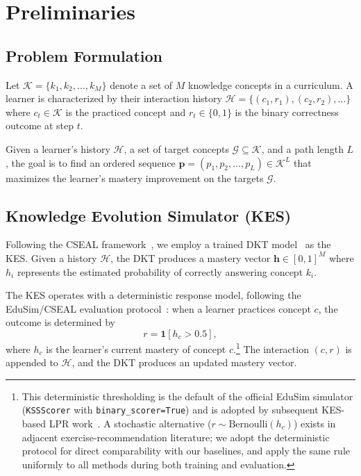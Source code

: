 \documentclass[sigconf,anonymous]{acmart}
\begin{document}
\section{Preliminaries}

\subsection{Problem Formulation}

Let $\mathcal{K} = \{k_1, k_2, \ldots, k_M\}$ denote a set of $M$ knowledge concepts in a curriculum. A learner is characterized by their interaction history $\mathcal{H} = \{(c_1, r_1), (c_2, r_2), \ldots\}$ where $c_t \in \mathcal{K}$ is the practiced concept and $r_t \in \{0, 1\}$ is the binary correctness outcome at step $t$.


\begin{definition}
Given a learner's history $\mathcal{H}$, a set of target concepts $\mathcal{G} \subseteq \mathcal{K}$, and a path length $L$, the goal is to find an ordered sequence $\mathbf{p} = (p_1, p_2, \ldots, p_L) \in \mathcal{K}^L$ that maximizes the learner's mastery improvement on the targets $\mathcal{G}$.
\end{definition}

\subsection{Knowledge Evolution Simulator (KES)}

Following the CSEAL framework~\cite{liu2019cseal}, we employ a trained DKT model~\cite{piech2015dkt} as the KES. Given a history $\mathcal{H}$, the DKT produces a mastery vector $\mathbf{h} \in [0,1]^M$ where $h_i$ represents the estimated probability of correctly answering concept $k_i$.

The KES operates with a deterministic response model, following the EduSim/CSEAL evaluation protocol~\cite{liu2019cseal}: when a learner practices concept $c$, the outcome is determined by
\begin{equation}
    r = \mathbf{1}[h_c > 0.5],
\end{equation}
where $h_c$ is the learner's current mastery of concept $c$.\footnote{This deterministic thresholding is the default of the official EduSim simulator (\texttt{KSSScorer} with \texttt{binary\_scorer=True}) and is adopted by subsequent KES-based LPR work~\cite{li2023gehrl,cheng2025knowlp}. A stochastic alternative ($r\!\sim\!\mathrm{Bernoulli}(h_c)$) exists in adjacent exercise-recommendation literature; we adopt the deterministic protocol for direct comparability with our baselines, and apply the same rule uniformly to all methods during both training and evaluation.} The interaction $(c, r)$ is appended to $\mathcal{H}$, and the DKT produces an updated mastery vector.
\end{document}
